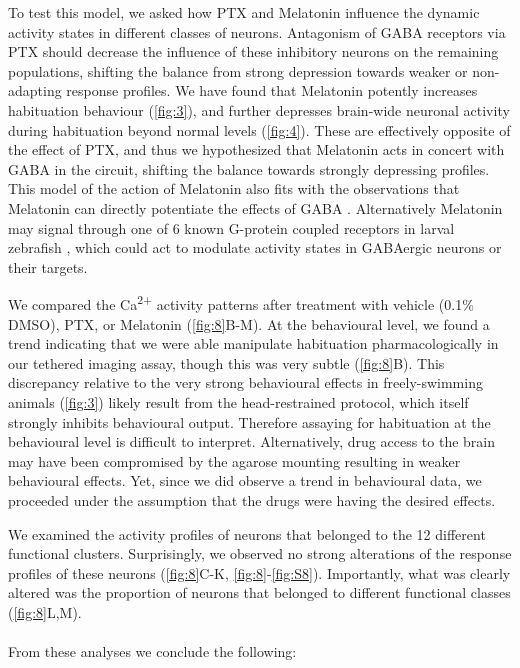 \documentclass[9pt,lineno]{RandlettLab_elife}
\begin{document}
To test this model, we asked how PTX and Melatonin influence the dynamic activity states in different classes of neurons. Antagonism of GABA receptors via PTX should decrease the influence of these inhibitory neurons on the remaining populations, shifting the balance from strong depression towards weaker or non-adapting response profiles. We have found that Melatonin potently increases habituation behaviour (\autoref{fig:3}), and further depresses brain-wide neuronal activity during habituation beyond normal levels (\autoref{fig:4}). These are effectively opposite of the effect of PTX, and thus we hypothesized that Melatonin acts in concert with GABA in the circuit, shifting the balance towards strongly depressing profiles. This model of the action of Melatonin also fits with the observations that Melatonin can directly potentiate the effects of GABA \cite{Cheng2012-gv, Niles1987-oc}. Alternatively Melatonin may signal through one of 6 known G-protein coupled receptors in larval zebrafish \cite{Maugars2020-pz}, which could act to modulate activity states in GABAergic neurons or their targets. 

We compared the Ca\textsuperscript{2+} activity patterns after treatment with vehicle (0.1\% DMSO), PTX, or Melatonin (\autoref{fig:8}B-M). At the behavioural level, we found a trend indicating that we were able manipulate habituation pharmacologically in our tethered imaging assay, though this was very subtle (\autoref{fig:8}B). This discrepancy relative to the very strong behavioural effects in freely-swimming animals (\autoref{fig:3}) likely result from the head-restrained protocol, which itself strongly inhibits behavioural output. Therefore assaying for habituation at the behavioural level is difficult to interpret. Alternatively, drug access to the brain may have been compromised by the agarose mounting resulting in weaker behavioural effects. Yet, since we did observe a trend in behavioural data, we proceeded under the assumption that the drugs were having the desired effects. 

We examined the activity profiles of neurons that belonged to the 12 different functional clusters. Surprisingly, we observed no strong alterations of the response profiles of these neurons (\autoref{fig:8}C-K, \autoref{fig:8}-\autoref{fig:S8}). Importantly, what was clearly altered was the proportion of neurons that belonged to different functional classes (\autoref{fig:8}L,M).
\\
\\From these analyses we conclude the following:
\end{document}
